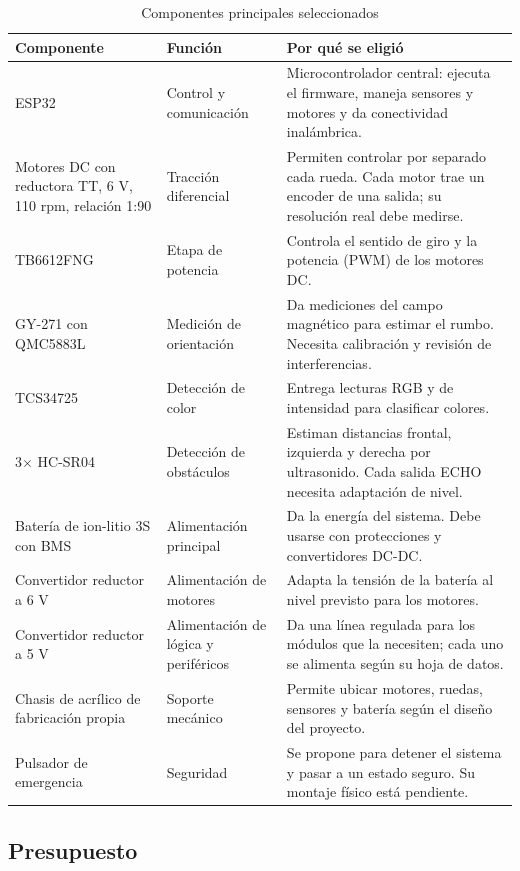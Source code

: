 \documentclass[journal]{IEEEtran}
\begin{document}
\begin{table}[t]
\centering
\caption{Componentes principales seleccionados}
\label{tab:componentes}
\scriptsize
\begin{tabular}{p{} p{} p{}}
\toprule
\textbf{Componente} & \textbf{Función} & \textbf{Por qué se eligió} \\
\midrule
ESP32 & Control y comunicación & Microcontrolador central: ejecuta el firmware, maneja sensores y motores y da conectividad inalámbrica. \\
Motores DC con reductora TT, 6 V, 110 rpm, relación 1:90 & Tracción diferencial & Permiten controlar por separado cada rueda. Cada motor trae un encoder de una salida; su resolución real debe medirse. \\
TB6612FNG & Etapa de potencia & Controla el sentido de giro y la potencia (PWM) de los motores DC. \\
GY-271 con QMC5883L & Medición de orientación & Da mediciones del campo magnético para estimar el rumbo. Necesita calibración y revisión de interferencias. \\
TCS34725 & Detección de color & Entrega lecturas RGB y de intensidad para clasificar colores. \\
3$\times$ HC-SR04 & Detección de obstáculos & Estiman distancias frontal, izquierda y derecha por ultrasonido. Cada salida ECHO necesita adaptación de nivel. \\
Batería de ion-litio 3S con BMS & Alimentación principal & Da la energía del sistema. Debe usarse con protecciones y convertidores DC-DC. \\
Convertidor reductor a 6 V & Alimentación de motores & Adapta la tensión de la batería al nivel previsto para los motores. \\
Convertidor reductor a 5 V & Alimentación de lógica y periféricos & Da una línea regulada para los módulos que la necesiten; cada uno se alimenta según su hoja de datos. \\
Chasis de acrílico de fabricación propia & Soporte mecánico & Permite ubicar motores, ruedas, sensores y batería según el diseño del proyecto. \\
Pulsador de emergencia & Seguridad & Se propone para detener el sistema y pasar a un estado seguro. Su montaje físico está pendiente. \\
\bottomrule
\end{tabular}
\end{table}

\subsection{Presupuesto}
\end{document}
